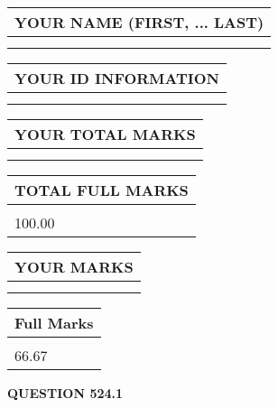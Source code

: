 \documentclass{ctexart}
\begin{document}
   
   
   
\newpage 
\setcounter{page}{ 
   524001 } 
   
   
   
   
\noindent\begin{tabular}{|l|}
\hline
YOUR NAME (FIRST, ... LAST)  \\
\hline
 \\ 
 \\ 
\hline
\end{tabular}
\hspace{0.05in} \begin{tabular}{|l|}
\hline
 YOUR   ID   INFORMATION  \\
\hline
 \\ 
 \\ 
\hline
\end{tabular}
   
   
\vspace{0.2in}\noindent\begin{tabular}{|l|}
\hline
YOUR TOTAL MARKS  \\
\hline
 \\ 
 \\ 
\hline
\end{tabular}
\hspace{0.05in} \begin{tabular}{|l|}
\hline
TOTAL FULL MARKS  \\
\hline
 \\ 
100.00 \\
\hline
\end{tabular}
   
   
 \vspace{0.2in}
 
 
 
 
   
   
  
\vspace{0.2in}
  
\noindent\begin{tabular}{|l|}
\hline
 YOUR MARKS  \\
\hline
 \\ 
 \\ 
\hline
\end{tabular}
\hspace{0.05in} \begin{tabular}{|l|}
\hline
 Full Marks  \\
\hline
 \\ 
66.67 \\
\hline
\end{tabular}
{\textbf{\Large{QUESTION
524.1 
}}}
  
\end{document}
